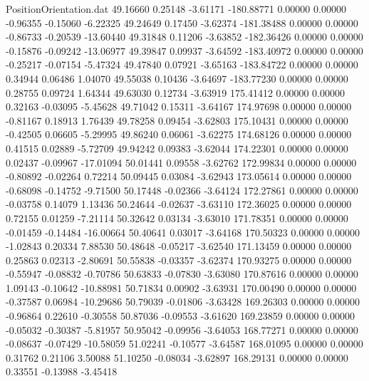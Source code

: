 \begin{filecontents}{PositionOrientation.dat}
  49.16660    0.25148   -3.61171  -180.88771    0.00000    0.00000   -0.96355   -0.15060   -6.22325
  49.24649    0.17450   -3.62374  -181.38488    0.00000    0.00000   -0.86733   -0.20539  -13.60440
  49.31848    0.11206   -3.63852  -182.36426    0.00000    0.00000   -0.15876   -0.09242  -13.06977
  49.39847    0.09937   -3.64592  -183.40972    0.00000    0.00000   -0.25217   -0.07154   -5.47324
  49.47840    0.07921   -3.65163  -183.84722    0.00000    0.00000    0.34944    0.06486    1.04070
  49.55038    0.10436   -3.64697  -183.77230    0.00000    0.00000    0.28755    0.09724    1.64344
  49.63030    0.12734   -3.63919   175.41412    0.00000    0.00000    0.32163   -0.03095   -5.45628
  49.71042    0.15311   -3.64167   174.97698    0.00000    0.00000   -0.81167    0.18913    1.76439
  49.78258    0.09454   -3.62803   175.10431    0.00000    0.00000   -0.42505    0.06605   -5.29995
  49.86240    0.06061   -3.62275   174.68126    0.00000    0.00000    0.41515    0.02889   -5.72709
  49.94242    0.09383   -3.62044   174.22301    0.00000    0.00000    0.02437   -0.09967  -17.01094
  50.01441    0.09558   -3.62762   172.99834    0.00000    0.00000   -0.80892   -0.02264    0.72214
  50.09445    0.03084   -3.62943   173.05614    0.00000    0.00000   -0.68098   -0.14752   -9.71500
  50.17448   -0.02366   -3.64124   172.27861    0.00000    0.00000   -0.03758    0.14079    1.13436
  50.24644   -0.02637   -3.63110   172.36025    0.00000    0.00000    0.72155    0.01259   -7.21114
  50.32642    0.03134   -3.63010   171.78351    0.00000    0.00000   -0.01459   -0.14484  -16.00664
  50.40641    0.03017   -3.64168   170.50323    0.00000    0.00000   -1.02843    0.20334    7.88530
  50.48648   -0.05217   -3.62540   171.13459    0.00000    0.00000    0.25863    0.02313   -2.80691
  50.55838   -0.03357   -3.62374   170.93275    0.00000    0.00000   -0.55947   -0.08832   -0.70786
  50.63833   -0.07830   -3.63080   170.87616    0.00000    0.00000    1.09143   -0.10642  -10.88981
  50.71834    0.00902   -3.63931   170.00490    0.00000    0.00000   -0.37587    0.06984  -10.29686
  50.79039   -0.01806   -3.63428   169.26303    0.00000    0.00000   -0.96864    0.22610   -0.30558
  50.87036   -0.09553   -3.61620   169.23859    0.00000    0.00000   -0.05032   -0.30387   -5.81957
  50.95042   -0.09956   -3.64053   168.77271    0.00000    0.00000   -0.08637   -0.07429  -10.58059
  51.02241   -0.10577   -3.64587   168.01095    0.00000    0.00000    0.31762    0.21106    3.50088
  51.10250   -0.08034   -3.62897   168.29131    0.00000    0.00000    0.33551   -0.13988   -3.45418

\end{filecontents}
